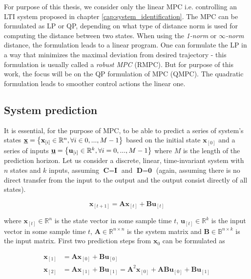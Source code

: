 For purpose of this thesis, we consider only the linear MPC i.e. controlling an LTI system proposed in chapter \ref{cap:system_identification}. The MPC can be formulated as LP or QP, depending on what type of distance norm is used for computing the distance between two states. When using the \mbox{\emph{1-norm}} or \mbox{\emph{$\infty$-norm}} distance, the formulation leads to a linear program. One can formulate the LP in a way that minimizes the maximal deviation from desired trajectory - this formulation is usually called a \emph{robust MPC} (RMPC). But for purpose of this work, the focus will be on the QP formulation of MPC (QMPC). The quadratic formulation leads to smoother control actions the linear one.

\subsection{System prediction}

It is essential, for the purpose of MPC, to be able to predict a series of system's states $\textbf{\underline{x}} = \left\lbrace \textbf{x}_{[i]} \in \mathbb{R}^{n}, \forall i \in 0, ..., M-1 \right\rbrace$ based on the initial state $\textbf{x}_{[0]}$ and a series of inputs $\textbf{\underline{u}} = \left\lbrace \textbf{u}_{[i]} \in \mathbb{R}^{k}, \forall i = 0, ..., M-1 \right\rbrace$ where $M$ is the length of the prediction horizon. Let us consider a discrete, linear, time-invariant system with $n$ states and $k$ inputs, assuming $\textbf{C} = \textbf{I}$ and $\textbf{D} = \textbf{0}$ (again, assuming there is no direct transfer from the input to the output and the output consist directly of all states).

\begin{equation}
\textbf{x}_{[t+1]} = \textbf{A}\textbf{x}_{[t]} + \textbf{B}\textbf{u}_{[t]}
\label{eq:mpc_lti_system}
\end{equation}

where $\textbf{x}_{[t]} \in \mathbb{R}^{n}$ is the state vector in some sample time $t$, $\textbf{u}_{[t]} \in \mathbb{R}^k$ is the input vector in some sample time $t$, $\textbf{A} \in \mathbb{R}^{n\times n}$ is the system matrix and $\textbf{B} \in \mathbb{B}^{n\times k}$ is the input matrix. First two prediction steps from $\textbf{x}_0$ can be formulated as

\begin{equation}
\begin{split}
\textbf{x}_{[1]} &= \textbf{A}\textbf{x}_{[0]} + \textbf{B}\textbf{u}_{[0]} \\
\textbf{x}_{[2]} &= \textbf{A}\textbf{x}_{[1]} + \textbf{B}\textbf{u}_{[1]} = \textbf{A}^2\textbf{x}_{[0]} + \textbf{A}\textbf{B}\textbf{u}_{[0]} + \textbf{B}\textbf{u}_{[1]}
\end{split}
\end{equation}

